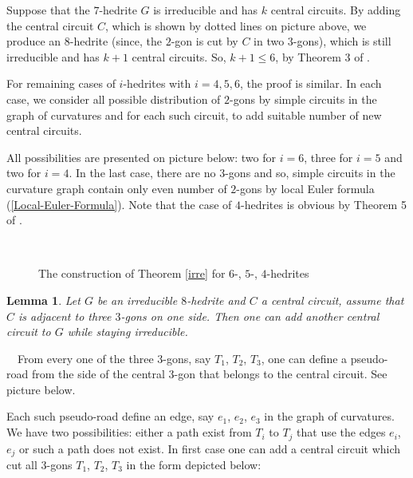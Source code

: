 \documentclass[12pt]{article}
\newtheorem{lemma}{Lemma}
\newcommand{\proof}{\noindent{\bf Proof.}\ \ }
\begin{document}
\begin{center}
\epsfxsize=40mm
\end{center}






Suppose that the $7$-hedrite $G$ is irreducible and has $k$ central circuits. By adding the central circuit $C$, which is shown by dotted lines on picture above, we produce an $8$-hedrite (since, the $2$-gon is cut by $C$ in two $3$-gons), which is still irreducible and has $k+1$ central circuits. So, $k+1\leq 6$, by Theorem 3 of \cite{DSt}.


For remaining cases of $i$-hedrites with $i=4,5,6$, the proof is similar. In each case, we consider all possible distribution of $2$-gons by simple circuits in the graph of curvatures and for each such circuit, to add suitable number of new central circuits. 


All possibilities are presented on picture below: two for $i=6$, three for $i=5$ and two for $i=4$. In the last case, there are no $3$-gons and so, simple circuits in the curvature graph contain only even number of $2$-gons by local Euler formula (\ref{Local-Euler-Formula}). Note that the case of
$4$-hedrites is obvious by Theorem 5 of \cite{DSt}.



\begin{figure}
\centering
\mbox{\quad
{}\quad
{}}
\caption{The construction of Theorem \ref{irre} for $6$-, $5$-, $4$-hedrites}
\label{The456hedriteCases}
\end{figure}




\begin{lemma}
Let $G$ be an irreducible $8$-hedrite and $C$ a central circuit, assume that $C$ is adjacent to three $3$-gons on one side. Then one can add another central circuit to $G$ while staying irreducible.
\end{lemma}
\proof From every one of the three $3$-gons, say $T_1$, $T_2$, $T_3$, one can define a pseudo-road from the side of the central $3$-gon that belongs to the central circuit. See picture below.
\begin{center}
\epsfxsize=40mm
\end{center}
Each such pseudo-road define an edge, say $e_1$, $e_2$, $e_3$ in the graph 
of curvatures. We have two possibilities: either a path exist from $T_i$ 
to $T_j$ that use the edges $e_i$, $e_j$ or such a path does not exist. In 
first case one can add a central circuit which cut all $3$-gons $T_1$, 
$T_2$, $T_3$ in the form depicted below:
\begin{center}
\epsfxsize=40mm
\end{center}
\end{document}
